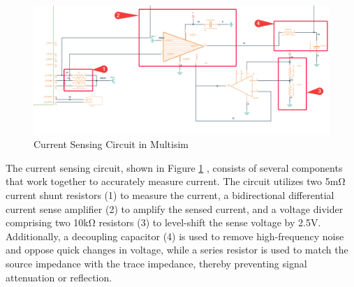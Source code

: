 \begin{figure}[H]
	\centering
	\includegraphics[width=6in]{sections/section4/images/PCBDesign/Multisim/MultisimCurrentSensing.png}
	\caption{Current Sensing Circuit in Multisim}
	\label{fig:current_sensing}
\end{figure}

The current sensing circuit, shown in Figure \ref{fig:current_sensing} , consists of several components that work together to accurately measure current. The circuit utilizes two 5mΩ current shunt resistors (1) to measure the current, a bidirectional differential current sense amplifier (2) to amplify the sensed current, and a voltage divider comprising two 10kΩ resistors (3) to level-shift the sense voltage by 2.5V. Additionally, a decoupling capacitor (4) is used to remove high-frequency noise and oppose quick changes in voltage, while a series resistor is used to match the source impedance with the trace impedance, thereby preventing signal attenuation or reflection.
